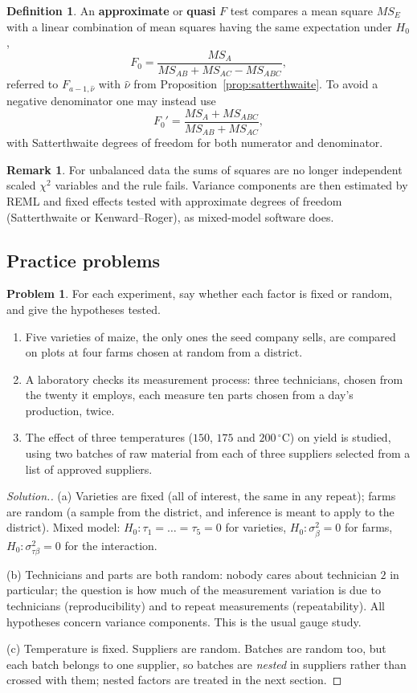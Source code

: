 \documentclass[11pt,a4paper]{article}
\numberwithin{equation}{section}
\theoremstyle{definition}
\newtheorem{defn}[thm]{Definition}
\newtheorem*{remark}{Remark}
\newtheorem{problemx}{Problem}[subsection]
\newenvironment{problem}{\begin{problemx}}{\end{problemx}}
\newenvironment{solution}
  {\renewcommand{\qedsymbol}{}\begin{proof}[\textit{Solution}.]}
  {\end{proof}}
\begin{document}
\begin{defn}
An \textbf{approximate} or \textbf{quasi} $F$ test compares a mean square $MS_E$ with a linear combination of mean squares having the same expectation under $H_0$,
\[
F_0 = \frac{MS_A}{MS_{AB} + MS_{AC} - MS_{ABC}} ,
\]
referred to $F_{a-1, \hat\nu}$ with $\hat\nu$ from Proposition~\ref{prop:satterthwaite}. To avoid a negative denominator one may instead use
\[
F_0' = \frac{MS_A + MS_{ABC}}{MS_{AB} + MS_{AC}} ,
\]
with Satterthwaite degrees of freedom for both numerator and denominator.
\end{defn}

\begin{remark}
For unbalanced data the sums of squares are no longer independent scaled $\chi^2$ variables and the rule fails. Variance components are then
estimated by REML and fixed effects tested with approximate degrees of freedom (Satterthwaite or Kenward--Roger), as mixed-model software does.
\end{remark}

\subsection{Practice problems}

\begin{problem}
For each experiment, say whether each factor is fixed or random, and give the hypotheses tested.
\begin{enumerate}[label=(\alph*)]
\item Five varieties of maize, the only ones the seed company sells, are compared on plots at four farms chosen at random from a district.
\item A laboratory checks its measurement process: three technicians, chosen from the twenty it employs, each measure ten parts chosen from a
day's production, twice.
\item The effect of three temperatures ($150$, $175$ and $200\,^\circ$C) on yield is studied, using two batches of raw material from each of three suppliers
selected from a list of approved suppliers.
\end{enumerate}
\end{problem}

\begin{solution}
(a) Varieties are fixed (all of interest, the same in any repeat); farms are random (a sample from the district, and inference is meant to apply to
the district). Mixed model: $H_0 : \tau_1 = \dots = \tau_5 = 0$ for varieties, $H_0 : \sigma^2_\beta = 0$ for farms, $H_0 : \sigma^2_{\tau\beta} = 0$ for the interaction.

(b) Technicians and parts are both random: nobody cares about technician $2$ in particular; the question is how much of the measurement variation is
due to technicians (reproducibility) and to repeat measurements (repeatability). All hypotheses concern variance components. This is the usual
gauge study.

(c) Temperature is fixed. Suppliers are random. Batches are random too, but each batch belongs to one supplier, so batches are \emph{nested} in
suppliers rather than crossed with them; nested factors are treated in the next section.
\end{solution}
\end{document}
